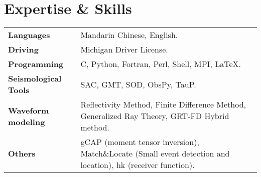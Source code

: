\section*{Expertise \& Skills}

\begin{tabular}{p{} p{}}
\textbf{Languages} & Mandarin Chinese, English. \\
\textbf{Driving} & Michigan Driver License. \\
\textbf{Programming} & C, Python, Fortran, Perl, Shell, MPI, LaTeX. \\
\textbf{Seismological Tools} & SAC, GMT, SOD, ObsPy, TauP. \\
\textbf{Waveform modeling} & Reflectivity Method, Finite Difference Method, Generalized Ray Theory, GRT-FD Hybrid method.\\
\textbf{Others} & gCAP (moment tensor inversion), Match\&Locate (Small event detection and location), hk (receiver function). \\
\end{tabular}
